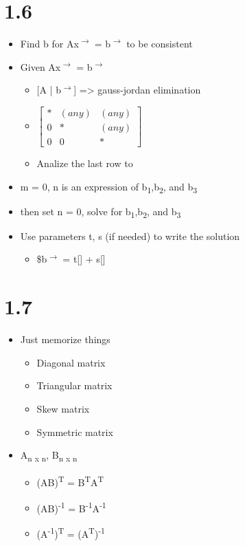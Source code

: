 \documentclass[11pt]{article}
\begin{document}
\section{1.6}
\label{sec:org116edf7}
\begin{itemize}
\item Find b for Ax\textsuperscript{\(\rightarrow\)} = b\textsuperscript{\(\rightarrow\)} to be consistent
\item Given Ax\textsuperscript{\(\rightarrow\)} = b\textsuperscript{\(\rightarrow\)}
\begin{itemize}
\item {[}A | b\textsuperscript{\(\rightarrow\)}] => gauss-jordan elimination
\item \(\begin{bmatrix}*&(any)&(any)\\0&*&(any)\\0&0&*\end{bmatrix}\)
\item Analize the last row to
\end{itemize}
\item m = 0, n is an expression of b\textsubscript{1},b\textsubscript{2}, and b\textsubscript{3}
\item then set n = 0, solve for b\textsubscript{1},b\textsubscript{2}, and b\textsubscript{3}
\item Use parameters t, s (if needed) to write the solution
\begin{itemize}
\item \$b\textsuperscript{\(\rightarrow\)} = t[] + s[]
\end{itemize}
\end{itemize}
\section{1.7}
\label{sec:org3b58fac}
\begin{itemize}
\item Just memorize things
\begin{itemize}
\item Diagonal matrix
\item Triangular matrix
\item Skew matrix
\item Symmetric matrix
\end{itemize}
\item A\textsubscript{n x n}, B\textsubscript{n x n}
\begin{itemize}
\item (AB)\textsuperscript{T} = B\textsuperscript{T}A\textsuperscript{T}
\item (AB)\textsuperscript{-1} = B\textsuperscript{-1}A\textsuperscript{-1}
\item (A\textsuperscript{-1})\textsuperscript{T} = (A\textsuperscript{T})\textsuperscript{-1}
\end{itemize}
\end{itemize}
\end{document}
